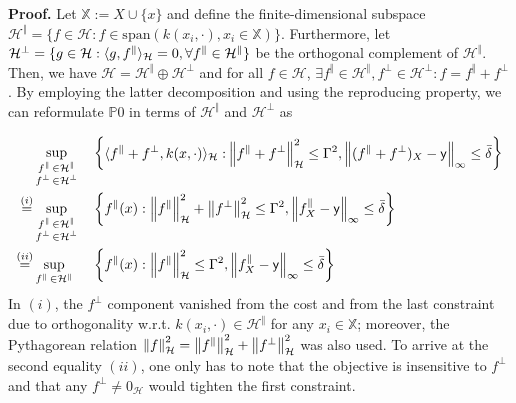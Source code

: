 \begin{my_proof}
	\textbf{Proof.}
	\label{app.thmproof}
	Let $\mathds{X} := X \cup \{x\}$ and define the finite-dimensional subspace $\mathcal{H}^\Vert=\{f\in\mathcal{H}: f \in \text{span}(k(x_i,\cdot), x_i \in \mathds{X})\}$. Furthermore, let $\mathcal{H}^\perp = \{g\in \mathcal{H}: \langle g, f^\Vert \rangle_\mathcal{H}=0, \forall f^\Vert \in \mathcal{H}^{\Vert} \}$ be the orthogonal complement of $\mathcal{H}^{\Vert}$. Then, we have $\mathcal{H}=\mathcal{H}^{\Vert} \oplus \mathcal{H}^\perp$ and for all $f\in \mathcal{H}$, $\exists f^{\Vert} \in \mathcal{H}^{\Vert}, f^\perp \in \mathcal{H}^\perp : f = f^{\Vert} + f^\perp$. By employing the latter decomposition and using the reproducing property, we can reformulate $\mathds{P}0$ in terms of $\mathcal{H}^{\Vert}$ and $\mathcal{H}^\perp$ as
	
	\begin{align}
		& \sup_{\substack{f^{\Vert} \, \in \mathcal{H}^{\Vert} \\ f^\perp \, \in \mathcal{H}^\perp}} &&\left\{ 
		\begin{aligned}
			&\langle f^{\Vert}+f^\perp, k(x,\cdot) \rangle_\mathcal{H} : \hspace{-8pt}&\left\| f^{\Vert}+f^\perp \right\|_\mathcal{H}^2 \leq \Gamma^2, \left\| (f^{\Vert}+f^\perp)_X - \mathsf{y} \right\|_\infty \leq \bar \delta 
		\end{aligned}
		\right\} 
		\\
		\overset{(i)}{=}& \sup_{\substack{f^{\Vert} \, \in \mathcal{H}^{\Vert} \\ f^\perp \, \in \mathcal{H}^\perp}} &&\left\{ f^{\Vert}(x) : \left\| f^{\Vert} \right\|_\mathcal{H}^2+\left\| f^\perp \right\|_\mathcal{H}^2 \leq \Gamma^2, \left\| f_{X}^\Vert - \mathsf{y} \right\|_\infty \leq \bar \delta \right\} \\
		\overset{(ii)}{=}& \sup_{f^{\Vert} \, \in \mathcal{H}^{\Vert}} &&\left\{ f^{\Vert}(x) : \left\| f^{\Vert} \right\|_\mathcal{H}^2 \leq \Gamma^2, \left\| f^{\Vert}_{X} - \mathsf{y} \right\|_\infty \leq \bar \delta \right\} \label{eq.last}
	\end{align}
	In $(i)$, the $f^\perp$ component vanished from the cost and from the last constraint due to orthogonality w.r.t. $k(x_i,\cdot) \in \mathcal{H}^\Vert$ for any $x_i \in \mathds{X}$; moreover, the Pythagorean relation $\left\| f \right\|_\mathcal{H}^2 = \left\| f^{\Vert} \right\|_\mathcal{H}^2 + \left\| f^\perp \right\|_\mathcal{H}^2$ was also used. To arrive at the second equality $(ii)$, one only has to note that the objective is insensitive to $f^\perp$ and that any $f^\perp \neq 0_{\mathcal{H}}$ would tighten the first constraint. 
	

\end{my_proof}
